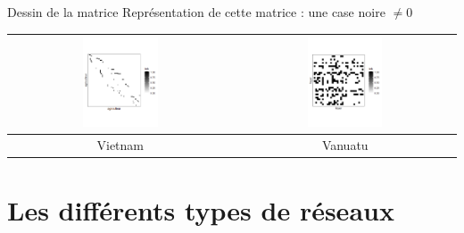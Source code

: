 \documentclass[compress,10pt]{beamer}
\begin{document}
\begin{frame}{Dessin de la matrice}
Représentation de cette matrice : une case noire   $ \neq 0$
\vspace{1em}

{\centering
\begin{tabular}{cc}
 \includegraphics[width =  0.35\textwidth]{plots/matrix_vietnam.png} & \includegraphics[width =  0.35\textwidth]{plots/Vanuatu_matrix.png}\\
\hline 
Vietnam & Vanuatu \\
\hline 
 \end{tabular}}
 
 \end{frame}
 



\section{Les différents types de réseaux}
\end{document}
